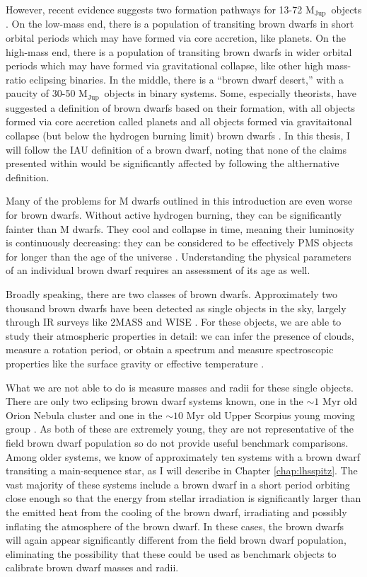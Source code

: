\documentclass[12pt]{caltech_thesis}
\newcommand{\mjup}{{M$_\textrm{Jup}$}}
\begin{document}
However, recent evidence suggests two formation pathways for 13-72 \mjup\ objects
\citep{Bayliss16}. 
On the low-mass end, there is a population of transiting brown dwarfs in short orbital
periods which may have formed via core accretion, like planets.
On the high-mass end, there is a population of transiting brown dwarfs in wider orbital
periods which may have formed via gravitational collapse, like other high mass-ratio
eclipsing binaries.
In the middle, there is a ``brown dwarf desert,'' with a paucity of 30-50 \mjup\ objects in
binary systems.
Some, especially theorists, have suggested a definition of brown dwarfs based on their
formation, with all objects formed via core accretion called planets and all objects
formed via gravitaitonal collapse (but below the hydrogen burning limit) brown dwarfs
\citep[e.g.][]{Chabrier14}.
In this thesis, I will follow the IAU definition of a brown dwarf, noting that none of the
claims presented within would be significantly affected by following the althernative
definition.

Many of the problems for M dwarfs outlined in this introduction are even worse for
brown dwarfs.
Without active hydrogen burning, they can be significantly fainter than M dwarfs.
They cool and collapse in time, meaning their luminosity is continuously decreasing:
they can be considered to be effectively PMS objects for longer than the age of the 
universe \citep{Burrows01}.
Understanding the physical parameters of an individual brown dwarf requires an assessment of its age as well.

Broadly speaking, there are two classes of brown dwarfs.
Approximately two thousand brown dwarfs have been detected as single objects in the sky,
largely through IR surveys like 2MASS and WISE \citep[e.g.][]{Kirkpatrick99, Kirkpatrick11}.
For these objects, we are able to study their atmospheric properties in detail: we can 
infer the presence of clouds, measure a rotation period, or obtain a spectrum and measure
spectroscopic properties like the surface gravity or effective temperature \citep[e.g.][]{Faherty14, Filippazzo15}. 

What we are not able to do is measure masses and radii for these single objects.
There are only two eclipsing brown dwarf systems known, one in the $\sim 1$ Myr old Orion
Nebula cluster and one in the $\sim 10$ Myr old Upper Scorpius young moving group
\citep{Stassun06, David16}.
As both of these are extremely young, they are not representative of the field brown dwarf
population so do not provide useful benchmark comparisons.
Among older systems, we know of approximately ten systems with a brown dwarf transiting a main-sequence star, as I will describe in Chapter \ref{chap:lhsspitz}.
The vast majority of these systems include a brown dwarf in a short period orbiting
close enough so that the energy from stellar irradiation is significantly larger than
the emitted heat from the cooling of the brown dwarf, irradiating and possibly inflating
the atmosphere of the brown dwarf.
In these cases, the brown dwarfs will again appear significantly different from the field
brown dwarf population, eliminating the possibility that these could be used as benchmark
objects to calibrate brown dwarf masses and radii.
\end{document}

